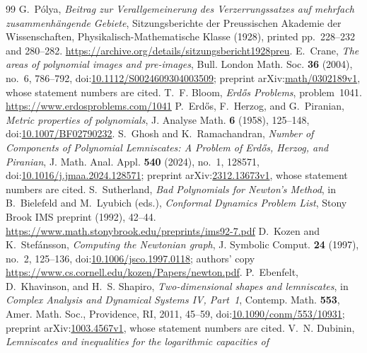 \begin{thebibliography}{99}
 G.~P\'olya,
  \emph{Beitrag zur Verallgemeinerung des Verzerrungssatzes auf mehrfach
  zusammenh\"angende Gebiete}, Sitzungsberichte der Preussischen Akademie der
  Wissenschaften, Physikalisch-Mathematische Klasse (1928), printed
  pp.~228--232 and 280--282.
  \url{https://archive.org/details/sitzungsbericht1928preu}.
 E.~Crane,
  \emph{The areas of polynomial images and pre-images}, Bull. London Math.
  Soc. \textbf{36} (2004), no.~6, 786--792,
  doi:\href{https://doi.org/10.1112/S0024609304003509}{10.1112/S0024609304003509};
  preprint arXiv:\href{https://arxiv.org/abs/math/0302189v1}{math/0302189v1},
  whose statement numbers are cited.
 T.~F. Bloom, \emph{Erd\H{o}s Problems}, problem~1041.
  \url{https://www.erdosproblems.com/1041}
 P.~Erd\H{o}s, F.~Herzog, and G.~Piranian,
  \emph{Metric properties of polynomials}, J. Analyse Math. \textbf{6}
  (1958), 125--148,
  doi:\href{https://doi.org/10.1007/BF02790232}{10.1007/BF02790232}.
 S.~Ghosh and K.~Ramachandran,
  \emph{Number of Components of Polynomial Lemniscates: A Problem of Erd\H{o}s,
  Herzog, and Piranian}, J. Math. Anal. Appl. \textbf{540} (2024), no.~1,
  128571,
  doi:\href{https://doi.org/10.1016/j.jmaa.2024.128571}{10.1016/j.jmaa.2024.128571};
  preprint arXiv:\href{https://arxiv.org/abs/2312.13673v1}{2312.13673v1},
  whose statement numbers are cited.
 S.~Sutherland,
  \emph{Bad Polynomials for Newton's Method}, in B.~Bielefeld and M.~Lyubich
  (eds.), \emph{Conformal Dynamics Problem List}, Stony Brook IMS preprint
  (1992), 42--44.
  \url{https://www.math.stonybrook.edu/preprints/ims92-7.pdf}
 D.~Kozen and K.~Stef\'ansson,
  \emph{Computing the Newtonian graph}, J. Symbolic Comput. \textbf{24}
  (1997), no.~2, 125--136,
  doi:\href{https://doi.org/10.1006/jsco.1997.0118}{10.1006/jsco.1997.0118};
  authors' copy \url{https://www.cs.cornell.edu/kozen/Papers/newton.pdf}.
 P.~Ebenfelt, D.~Khavinson, and H.~S. Shapiro,
  \emph{Two-dimensional shapes and lemniscates}, in \emph{Complex Analysis and
  Dynamical Systems IV, Part~1}, Contemp. Math. \textbf{553}, Amer. Math. Soc.,
  Providence, RI, 2011, 45--59,
  doi:\href{https://doi.org/10.1090/conm/553/10931}{10.1090/conm/553/10931};
  preprint arXiv:\href{https://arxiv.org/abs/1003.4567v1}{1003.4567v1},
  whose statement numbers are cited.
 V.~N. Dubinin,
  \emph{Lemniscates and inequalities for the logarithmic capacities of
}
\end{thebibliography}
